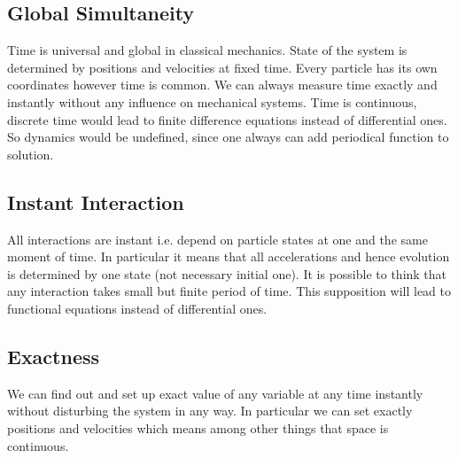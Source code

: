 \documentclass[11pt]{book}
\begin{document}
\subsection{Global Simultaneity}
Time is universal and global in classical mechanics. State of the system is determined by
positions and velocities at fixed time. Every particle has its own coordinates however time
is common. We can always measure time  exactly and instantly without any influence 
on mechanical systems. Time is continuous, discrete time would lead to finite difference
equations instead of differential ones. So dynamics would be undefined, since one always can
add periodical function to solution.

\subsection{Instant Interaction}
All interactions are instant i.e. depend on particle states at one and the same moment of time.
In particular it means that all accelerations and hence evolution is determined by one state (not necessary initial one). It is possible to think that any interaction takes small but finite period of time. This supposition will lead to functional equations instead of differential ones.

\subsection{Exactness}
We can find out and set up exact value of any variable at any time instantly without disturbing
the system in any way. In particular we can set exactly positions and velocities which means 
among other things that space is continuous.







\printbibliography[
heading=bibintoc,
title={References}
] 
\clearpage
\end{document}
